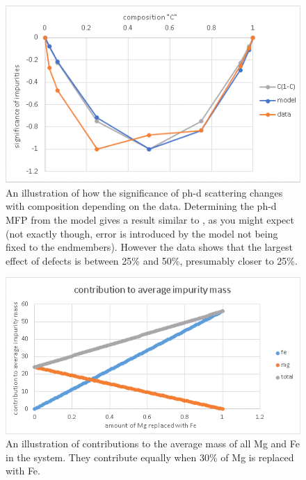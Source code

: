 \begin{figure}[p]
  \includegraphics[width=\linewidth]{Figures/gk_mfp_ph-d_significance_4000K.png}
  \caption[gk mfp ph-d significance 4000K]{An illustration of how the significance of ph-d scattering changes with composition depending on the data. Determining the ph-d MFP from the model gives a result similar to \coc, as you might expect (not exactly though, error is introduced by the model not being fixed to the endmembers). However the data shows that the largest effect of defects is between 25\% and 50\%, presumably closer to 25\%.}
  \label{fig:gk_mfp_ph-d_significance_4000K}
\end{figure}

\begin{figure}[h!]
  \includegraphics[width=\linewidth]{Figures/gk_mfp_ph-d_mass_demo.png}
  \caption[gk mfp ph-d mass demo]{An illustration of contributions to the average mass of all Mg and Fe in the system. They contribute equally when 30\% of Mg is replaced with Fe.}
  \label{fig:gk_mfp_ph-d_mass_demo}
\end{figure}






\pagebreak
